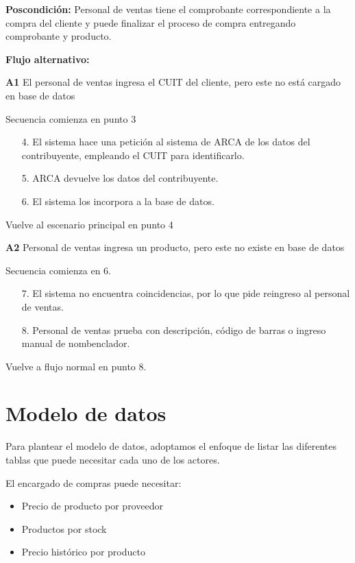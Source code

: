 \documentclass[11pt]{article}
\begin{document}
\textbf{Poscondición:}
Personal de ventas tiene el comprobante correspondiente a la compra del cliente y puede finalizar el proceso de compra entregando comprobante y producto.

\textbf{Flujo alternativo:}

\textbf{A1} El personal de ventas ingresa el CUIT del cliente, pero este no está cargado en base de datos

Secuencia comienza en punto 3

\begin{enumerate}
	\item[4.] El sistema hace una petición al sistema de ARCA de los datos del contribuyente, 
	empleando el CUIT para identificarlo.
	\item[5.] ARCA devuelve los datos del contribuyente.
	\item[6.] El sistema los incorpora a la base de datos.
\end{enumerate}

Vuelve al escenario principal en punto 4

\textbf{A2} Personal de ventas ingresa un producto, pero este no existe en base de datos

Secuencia comienza en 6.

\begin{enumerate}
	\item[7.] El sistema no encuentra coincidencias, por lo que pide reingreso al personal de ventas.
	\item[8.] Personal de ventas prueba con descripción, código de barras o ingreso manual de nombenclador.
\end{enumerate}

Vuelve a flujo normal en punto 8.

\section{Modelo de datos}

Para plantear el modelo de datos,
adoptamos el enfoque de listar las diferentes tablas que puede necesitar cada uno de los actores.

El encargado de compras puede necesitar:
\begin{itemize}
	\item Precio de producto por proveedor 
	\item Productos por stock 
	\item Precio histórico por producto
\end{itemize}
\end{document}
